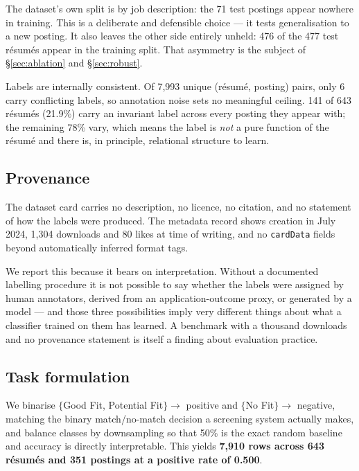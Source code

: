 \documentclass[11pt]{article}                      %
\begin{document}
The dataset's own split is by job description: the 71 test postings appear
nowhere in training. This is a deliberate and defensible choice --- it tests
generalisation to a new posting. It also leaves the other side entirely unheld:
476 of the 477 test résumés appear in the training split. That asymmetry is the
subject of \S\ref{sec:ablation} and \S\ref{sec:robust}.

Labels are internally consistent. Of 7{,}993 unique (résumé, posting) pairs, only
6 carry conflicting labels, so annotation noise sets no meaningful ceiling. 141
of 643 résumés (21.9\%) carry an invariant label across every posting they appear
with; the remaining 78\% vary, which means the label is \emph{not} a pure
function of the résumé and there is, in principle, relational structure to learn.

\subsection{Provenance}
\label{sec:provenance}

The dataset card carries no description, no licence, no citation, and no
statement of how the labels were produced. The metadata record shows creation in
July 2024, 1{,}304 downloads and 80 likes at time of writing, and no
\texttt{cardData} fields beyond automatically inferred format tags.

We report this because it bears on interpretation. Without a documented
labelling procedure it is not possible to say whether the labels were assigned by
human annotators, derived from an application-outcome proxy, or generated by a
model --- and those three possibilities imply very different things about what a
classifier trained on them has learned. A benchmark with a thousand downloads and
no provenance statement is itself a finding about evaluation practice.

\subsection{Task formulation}

We binarise $\{$Good Fit, Potential Fit$\} \rightarrow$ positive and
$\{$No Fit$\} \rightarrow$ negative, matching the binary match/no-match decision a
screening system actually makes, and balance classes by downsampling so that 50\%
is the exact random baseline and accuracy is directly interpretable. This yields
\textbf{7{,}910 rows across 643 résumés and 351 postings at a positive rate of
0.500}.
\end{document}
